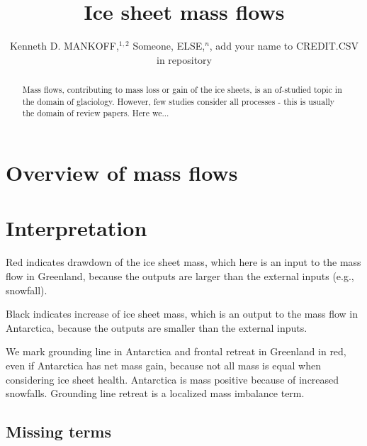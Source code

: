 \documentclass[review,jog]{igs}
\begin{document}
\title[Sankey mass flows]{Ice sheet mass flows}

\author[Mankoff and others]
       {Kenneth D. MANKOFF,$^{1,2}$
         Someone, ELSE,$^n$,
       add your name to CREDIT.CSV in repository}


\begin{frontmatter}
\maketitle
\begin{abstract}
  Mass flows, contributing to mass loss or gain of the ice sheets, is an of-studied topic in the domain of glaciology. However, few studies consider all processes - this is usually the domain of review papers.  Here we...
\end{abstract}
\end{frontmatter}

\section{Overview of mass flows}

\section{Interpretation}

Red indicates drawdown of the ice sheet mass, which here is an input to the mass flow in Greenland, because the outputs are larger than the external inputs (e.g., snowfall).

Black indicates increase of ice sheet mass, which is an output to the mass flow in Antarctica, because the outputs are smaller than the external inputs.

We mark grounding line in Antarctica and frontal retreat in Greenland in red, even if Antarctica has net mass gain, because not all mass is equal when considering ice sheet health. Antarctica is mass positive because of increased snowfalls. Grounding line retreat is a localized mass imbalance term.

\subsection{Missing terms}
\end{document}
